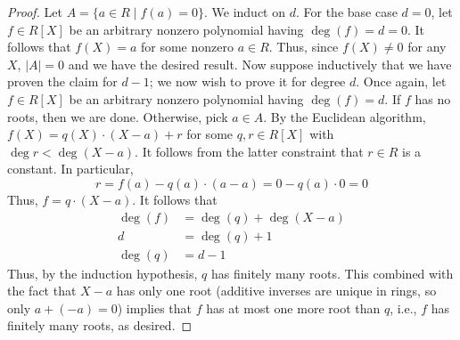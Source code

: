\documentclass[../psets.tex]{subfiles}
\begin{document}
\begin{enumerate}
\begin{proof}
        Let $A=\{a\in R\mid f(a)=0\}$. We induct on $d$. For the base case $d=0$, let $f\in R[X]$ be an arbitrary nonzero polynomial having $\deg(f)=d=0$. It follows that $f(X)=a$ for some nonzero $a\in R$. Thus, since $f(X)\neq 0$ for any $X$, $|A|=0$ and we have the desired result. Now suppose inductively that we have proven the claim for $d-1$; we now wish to prove it for degree $d$. Once again, let $f\in R[X]$ be an arbitrary nonzero polynomial having $\deg(f)=d$. If $f$ has no roots, then we are done. Otherwise, pick $a\in A$. By the Euclidean algorithm, $f(X)=q(X)\cdot(X-a)+r$ for some $q,r\in R[X]$ with $\deg{r}<\deg(X-a)$. It follows from the latter constraint that $r\in R$ is a constant. In particular,
        \begin{equation*}
            r = f(a)-q(a)\cdot(a-a)
            = 0-q(a)\cdot 0
            = 0
        \end{equation*}
        Thus, $f=q\cdot(X-a)$. It follows that
        \begin{align*}
            \deg(f) &= \deg(q)+\deg(X-a)\\
            d &= \deg(q)+1\\
            \deg(q) &= d-1
        \end{align*}
        Thus, by the induction hypothesis, $q$ has finitely many roots. This combined with the fact that $X-a$ has only one root (additive inverses are unique in rings, so only $a+(-a)=0$) implies that $f$ has at most one more root than $q$, i.e., $f$ has finitely many roots, as desired.
    \end{proof}
\end{enumerate}
\end{document}
